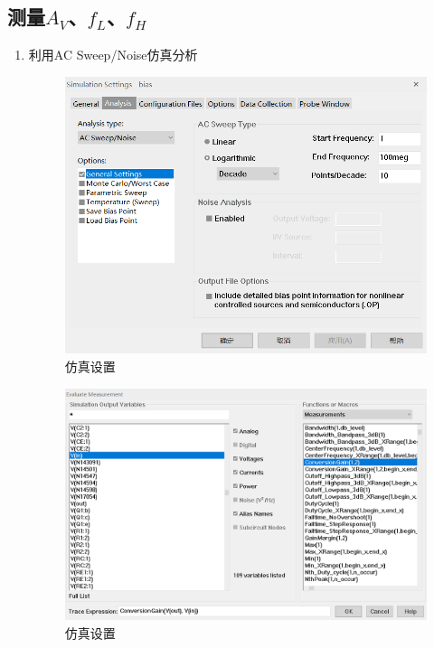 \documentclass{../source/Experiment}
\begin{document}
        \subsection{测量$A_V$、$f_L$、$f_H$}
        \begin{enumerate}
            \item 利用AC Sweep/Noise仿真分析
                \newpage
                \begin{figure}[h]
                    \centering
                    \includegraphics[scale = 0.6]{pic/仿真2}
                    \caption{仿真设置}
                \end{figure}
                \begin{figure}[h]
                    \centering
                    \includegraphics[scale = 0.5]{pic/仿真3}
                    \caption{仿真设置}

\end{figure}
\end{enumerate}
\end{document}
